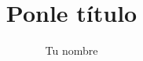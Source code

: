 \documentclass[letterpaper,12pt,leqno]{article}
\begin{document}
\title{Ponle título}

\author{Tu nombre}

\date{}   


\maketitle
\end{document}
